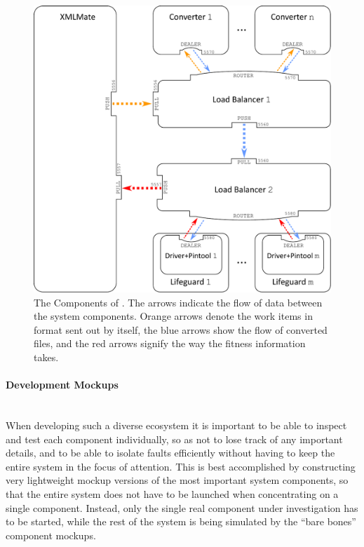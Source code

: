 \begin{figure}[htb]
\centering
  \includegraphics[width=\columnwidth]{system.pdf} 
  \caption{The Components of \xmlmate. 
  The arrows indicate the flow of data between the system components. Orange arrows denote the work items
  in \xml format sent out by \xmlmate itself, the blue arrows show the flow of converted files, and the red
  arrows signify the way the fitness information takes.
}
  \label{fig:components}
\end{figure}

\paragraph{Development Mockups} ~\\
When developing such a diverse ecosystem it is important to be able to inspect and test each component
individually, so as not to lose track of any important details, and to be able to isolate faults efficiently
without having to keep the entire system in the focus of attention. 
This is best accomplished by constructing
very lightweight mockup versions of the most important system components, so that the entire system does not
have to be launched when concentrating on a single component. Instead, only the single real component under
investigation has to be started, while the rest of the system is being simulated by the ``bare bones''
component mockups.

